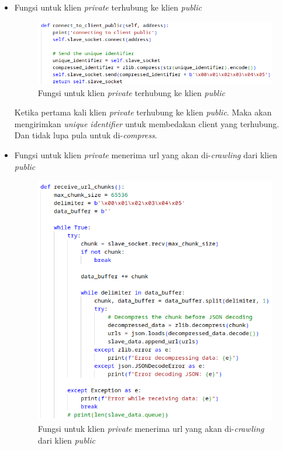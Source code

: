 \begin{itemize}
	\item{Fungsi untuk klien \emph{private} terhubung ke klien \emph{public}}
	\begin{figure}[H]
		\centering{}
		\includegraphics[width=1\textwidth]{gambar/kode/potongan_client_11}
		\caption{Fungsi untuk klien \emph{private} terhubung ke klien \emph{public}}
	\end{figure}
	Ketika pertama kali klien \emph{private} terhubung ke klien \emph{public}. Maka akan mengirimkan \emph{unique identifier} untuk membedakan client yang terhubung. Dan tidak lupa pula untuk di-\emph{compress}.

	\clearpage
	\item{Fungsi untuk klien \emph{private} menerima url yang akan di-\emph{crawling} dari klien \emph{public}}
	\begin{figure}[H]
		\centering{}
		\includegraphics[width=1\textwidth]{gambar/kode/potongan_client_12}
		\caption{Fungsi untuk klien \emph{private} menerima url yang akan di-\emph{crawling} dari klien \emph{public}}
	\end{figure}


\end{itemize}
